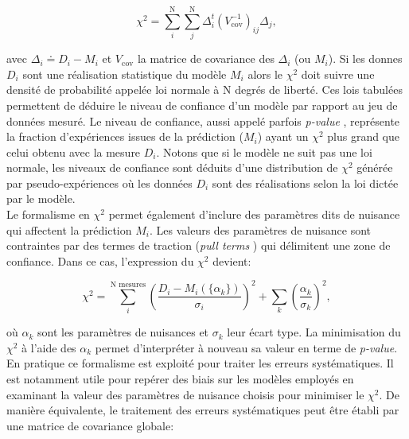\begin{equation}
\label{eq:cov_chi2}
    \chi^2 = \sum_i^\textrm{N} \sum_j^\textrm{N} \Delta_i^t \left( V_\textrm{cov}^{-1} \right)_{ij} \Delta_j,
\end{equation}

\bigbreak

avec $\Delta_i \doteq D_i - M_i$ et $V_\textrm{cov}$ la matrice de covariance des $\Delta_i$ (ou $M_i$). Si les donnes $D_i$ sont une réalisation statistique du modèle $M_i$ alors le $\chi^2$ doit suivre une densité de probabilité appelée \og loi normale \fg{} à N degrés de liberté. Ces lois tabulées permettent de déduire le niveau de confiance d'un modèle par rapport au jeu de données mesuré. Le niveau de confiance, aussi appelé parfois \og \textit{p-value} \fg{}, représente la fraction d'expériences issues de la prédiction ($M_i$) ayant un $\chi^2$ plus grand que celui obtenu avec la mesure $D_i$. Notons que si le modèle ne suit pas  une loi normale, les niveaux de confiance sont déduits d'une distribution de $\chi^2$ générée par pseudo-expériences où les données $D_i$ sont des réalisations selon la loi dictée par le modèle.\\

Le formalisme en $\chi^2$ permet également d'inclure des paramètres dits \og de nuisance \fg{} qui affectent la prédiction $M_i$. Les valeurs des paramètres de nuisance sont contraintes par des termes de traction (\og \textit{pull terms} \fg{}) qui délimitent une zone de confiance. Dans ce cas, l'expression du $\chi^2$ devient:

\begin{equation}
\label{eq:nuisance_param_chi2}
    \chi^2 = \sum_i^\textrm{N mesures} \left( \frac{D_i - M_i(\{ \alpha_k \})}{\sigma_i} \right)^2 + \sum_k \left( \frac{\alpha_k}{\sigma_k} \right)^2,
\end{equation}

\bigbreak

où $\alpha_k$ sont les paramètres de nuisances et $\sigma_k$ leur écart type. La minimisation du $\chi^2$ à l'aide des $\alpha_k$ permet d'interpréter à nouveau sa valeur en terme de \textit{p-value}. En pratique ce formalisme est exploité pour traiter les erreurs systématiques. Il est notamment utile pour repérer des biais sur les modèles employés en examinant la valeur des paramètres de nuisance choisis pour minimiser le $\chi^2$. De manière équivalente, le traitement des erreurs systématiques peut être établi par une matrice de covariance globale:

